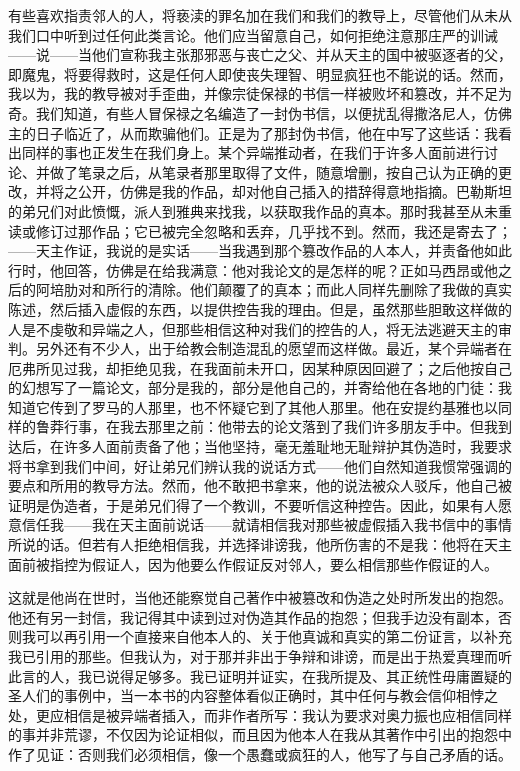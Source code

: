 有些喜欢指责邻人的人，将亵渎的罪名加在我们和我们的教导上，尽管他们从未从我们口中听到过任何此类言论。他们应当留意自己，如何拒绝注意那庄严的训诫——说——当他们宣称我主张那邪恶与丧亡之父、并从天主的国中被驱逐者的父，即魔鬼，将要得救时，这是任何人即使丧失理智、明显疯狂也不能说的话。然而，我以为，我的教导被对手歪曲，并像宗徒保禄的书信一样被败坏和篡改，并不足为奇。我们知道，有些人冒保禄之名编造了一封伪书信，以便扰乱得撒洛尼人，仿佛主的日子临近了，从而欺骗他们。正是为了那封伪书信，他在中写了这些话：我看出同样的事也正发生在我们身上。某个异端推动者，在我们于许多人面前进行讨论、并做了笔录之后，从笔录者那里取得了文件，随意增删，按自己认为正确的更改，并将之公开，仿佛是我的作品，却对他自己插入的措辞得意地指摘。巴勒斯坦的弟兄们对此愤慨，派人到雅典来找我，以获取我作品的真本。那时我甚至从未重读或修订过那作品；它已被完全忽略和丢弃，几乎找不到。然而，我还是寄去了；——天主作证，我说的是实话——当我遇到那个篡改作品的人本人，并责备他如此行时，他回答，仿佛是在给我满意：他对我论文的是怎样的呢？正如马西昂或他之后的阿培肋对和所行的清除。他们颠覆了的真本；而此人同样先删除了我做的真实陈述，然后插入虚假的东西，以提供控告我的理由。但是，虽然那些胆敢这样做的人是不虔敬和异端之人，但那些相信这种对我们的控告的人，将无法逃避天主的审判。另外还有不少人，出于给教会制造混乱的愿望而这样做。最近，某个异端者在厄弗所见过我，却拒绝见我，在我面前未开口，因某种原因回避了；之后他按自己的幻想写了一篇论文，部分是我的，部分是他自己的，并寄给他在各地的门徒：我知道它传到了罗马的人那里，也不怀疑它到了其他人那里。他在安提约基雅也以同样的鲁莽行事，在我去那里之前：他带去的论文落到了我们许多朋友手中。但我到达后，在许多人面前责备了他；当他坚持，毫无羞耻地无耻辩护其伪造时，我要求将书拿到我们中间，好让弟兄们辨认我的说话方式——他们自然知道我惯常强调的要点和所用的教导方法。然而，他不敢把书拿来，他的说法被众人驳斥，他自己被证明是伪造者，于是弟兄们得了一个教训，不要听信这种控告。因此，如果有人愿意信任我——我在天主面前说话——就请相信我对那些被虚假插入我书信中的事情所说的话。但若有人拒绝相信我，并选择诽谤我，他所伤害的不是我：他将在天主面前被指控为假证人，因为他要么作假证反对邻人，要么相信那些作假证的人。\par

这就是他尚在世时，当他还能察觉自己著作中被篡改和伪造之处时所发出的抱怨。他还有另一封信，我记得其中读到过对伪造其作品的抱怨；但我手边没有副本，否则我可以再引用一个直接来自他本人的、关于他真诚和真实的第二份证言，以补充我已引用的那些。但我认为，对于那并非出于争辩和诽谤，而是出于热爱真理而听此言的人，我已说得足够多。我已证明并证实，在我所提及、其正统性毋庸置疑的圣人们的事例中，当一本书的内容整体看似正确时，其中任何与教会信仰相悖之处，更应相信是被异端者插入，而非作者所写：我认为要求对奥力振也应相信同样的事并非荒谬，不仅因为论证相似，而且因为他本人在我从其著作中引出的抱怨中作了见证：否则我们必须相信，像一个愚蠢或疯狂的人，他写了与自己矛盾的话。\par

